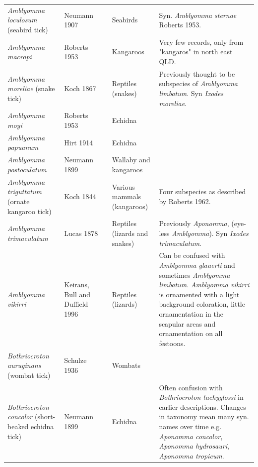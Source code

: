 \documentclass[a4paper, nobind]{templates/ociamthesis}
\begin{document}
\begin{landscape}
\begin{longtable}[t]{>{\raggedright\arraybackslash}p{4cm}>{\raggedright\arraybackslash}p{3cm}>{\raggedright\arraybackslash}p{1cm}>{\raggedright\arraybackslash}p{4cm}>{\raggedright\arraybackslash}p{6cm}}
\textit{Amblyomma loculosum} (seabird tick) & Neumann 1907 & \multicolumn{1}{c}{\cellcolor[HTML]{8DD3C7}{\textcolor{white}{Y}}} & Seabirds & Syn. \textit{Amblyomma sternae} Roberts 1953.\\
\textit{Amblyomma macropi} & Roberts 1953 & \multicolumn{1}{c}{\cellcolor[HTML]{BEBADA}{\textcolor{white}{N}}} & Kangaroos & Very few records, only from "kangaros" in north east QLD.\\
\textit{Amblyomma moreliae} (snake tick) & Koch 1867 & \multicolumn{1}{c}{\cellcolor[HTML]{8DD3C7}{\textcolor{white}{Y}}} & Reptiles (snakes) & Previously thought to be subspecies of \textit{Amblyomma limbatum}. Syn \textit{Ixodes moreliae}.\\
\textit{Amblyomma moyi} & Roberts 1953 & \multicolumn{1}{c}{\cellcolor[HTML]{BEBADA}{\textcolor{white}{N}}} & Echidna & \\
\textit{Amblyomma papuanum} & Hirt 1914 & \multicolumn{1}{c}{\cellcolor[HTML]{BEBADA}{\textcolor{white}{N}}} & Echidna & \\
\textit{Amblyomma postoculatum} & Neumann 1899 & \multicolumn{1}{c}{\cellcolor[HTML]{8DD3C7}{\textcolor{white}{Y}}} & Wallaby and kangaroos & \\
\textit{Amblyomma triguttatum} (ornate kangaroo tick) & Koch 1844 & \multicolumn{1}{c}{\cellcolor[HTML]{8DD3C7}{\textcolor{white}{Y}}} & Various mammals (kangaroos) & Four subspecies as described by Roberts 1962.\\
\textit{Amblyomma trimaculatum} & Lucas 1878 & \multicolumn{1}{c}{\cellcolor[HTML]{BEBADA}{\textcolor{white}{N}}} & Reptiles (lizards and snakes) & Previously \textit{Aponomma}, (eye-less \textit{Amblyomma}). Syn \textit{Ixodes trimaculatum}.\\
\textit{Amblyomma vikirri} & Keirans, Bull and Duffield 1996 & \multicolumn{1}{c}{\cellcolor[HTML]{BEBADA}{\textcolor{white}{N}}} & Reptiles (lizards) & Can be confused with \textit{Amblyomma glauerti} and sometimes \textit{Amblyomma limbatum}. \textit{Amblyomma vikirri} is ornamented with a light background coloration, little ornamentation in the scapular areas and ornamentation on all festoons.\\
\textit{Bothriocroton auruginans} (wombat tick) & Schulze 1936 & \multicolumn{1}{c}{\cellcolor[HTML]{8DD3C7}{\textcolor{white}{Y}}} & Wombats & \\
\textit{Bothriocroton concolor} (short-beaked echidna tick) & Neumann 1899 & \multicolumn{1}{c}{\cellcolor[HTML]{BEBADA}{\textcolor{white}{N}}} & Echidna & Often confusion with \textit{Bothriocroton tachyglossi} in earlier descriptions. Changes in taxonomy mean many syn. names over time e.g. \textit{Aponomma concolor}, \textit{Aponomma hydrosauri}, \textit{Aponomma tropicum}.\\

\end{longtable}
\end{landscape}
\end{document}
